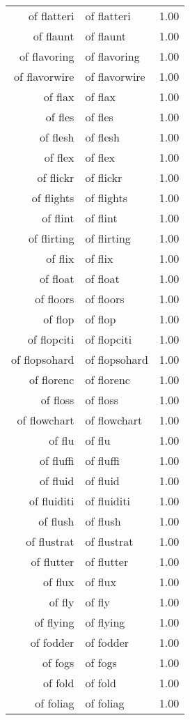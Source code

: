 \begin{table}[ht]
\begin{tabular}{rlr}
  of flatteri & of flatteri & 1.00 \\ 
  of flaunt & of flaunt & 1.00 \\ 
  of flavoring & of flavoring & 1.00 \\ 
  of flavorwire & of flavorwire & 1.00 \\ 
  of flax & of flax & 1.00 \\ 
  of fles & of fles & 1.00 \\ 
  of flesh & of flesh & 1.00 \\ 
  of flex & of flex & 1.00 \\ 
  of flickr & of flickr & 1.00 \\ 
  of flights & of flights & 1.00 \\ 
  of flint & of flint & 1.00 \\ 
  of flirting & of flirting & 1.00 \\ 
  of flix & of flix & 1.00 \\ 
  of float & of float & 1.00 \\ 
  of floors & of floors & 1.00 \\ 
  of flop & of flop & 1.00 \\ 
  of flopciti & of flopciti & 1.00 \\ 
  of flopsohard & of flopsohard & 1.00 \\ 
  of florenc & of florenc & 1.00 \\ 
  of floss & of floss & 1.00 \\ 
  of flowchart & of flowchart & 1.00 \\ 
  of flu & of flu & 1.00 \\ 
  of fluffi & of fluffi & 1.00 \\ 
  of fluid & of fluid & 1.00 \\ 
  of fluiditi & of fluiditi & 1.00 \\ 
  of flush & of flush & 1.00 \\ 
  of flustrat & of flustrat & 1.00 \\ 
  of flutter & of flutter & 1.00 \\ 
  of flux & of flux & 1.00 \\ 
  of fly & of fly & 1.00 \\ 
  of flying & of flying & 1.00 \\ 
  of fodder & of fodder & 1.00 \\ 
  of fogs & of fogs & 1.00 \\ 
  of fold & of fold & 1.00 \\ 
  of foliag & of foliag & 1.00 \\ 

\end{tabular}
\end{table}
